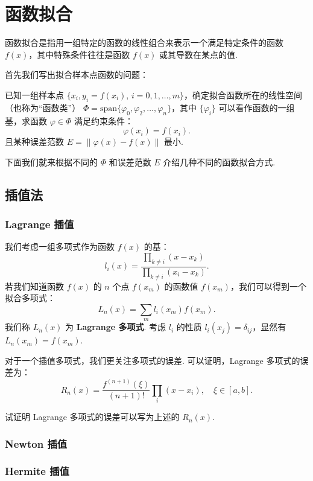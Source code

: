 \chapter{函数拟合}
函数拟合是指用一组特定的函数的线性组合来表示一个满足特定条件的函数 $f(x)$，其中特殊条件往往是函数 $f(x)$ 或其导数在某点的值.

首先我们写出拟合样本点函数的问题：
\begin{problembox}
    已知一组样本点 $\{x_i,y_i = f(x_i),\, i=0,1,\dots,m\}$，确定拟合函数所在的线性空间（也称为“函数类”） $\Phi = \mathrm{span} \{\varphi_0, \varphi_2,\dots,\varphi_n\}$，其中 $\{\varphi_i\}$ 可以看作函数的一组基，求函数 $\varphi \in \Phi$ 满足约束条件：
    \[
        \varphi(x_i) = f(x_i).
    \]
    且某种误差范数 $E = \|\varphi(x)-f(x)\|$ 最小.
\end{problembox} 

下面我们就来根据不同的 $\Phi$ 和误差范数 $E$ 介绍几种不同的函数拟合方式.

\section{插值法}
\subsection{Lagrange 插值}
我们考虑一组多项式作为函数 $f(x)$ 的基：
\[
    l_i(x) = \dfrac{\prod_{k\neq i}(x-x_k)}{\prod_{k\neq i}(x_i-x_k)}.
\]
若我们知道函数 $f(x)$ 的 $n$ 个点 $f(x_m)$ 的函数值 $f(x_m)$，我们可以得到一个拟合多项式：
\[
    L_n(x) = \sum_{m} l_i(x_m)f(x_m).
\]
我们称 $L_n(x)$ 为 {\bf Lagrange 多项式}. 考虑 $l_i$ 的性质 $l_i(x_j) = \delta_{ij}$，显然有 $L_n(x_m) = f(x_m)$.

对于一个插值多项式，我们更关注多项式的误差. 可以证明，Lagrange 多项式的误差为：
\[
    R_n(x) = \dfrac{f^{(n+1)}(\xi)}{(n+1)!}\prod_i( x-x_i),\quad \xi \in [a,b].
\]
\begin{problembox}
    \begin{example}
        试证明 Lagrange 多项式的误差可以写为上述的 $R_n(x)$.
    \end{example}
\end{problembox}

\subsection{Newton 插值}

\subsection{Hermite 插值}


